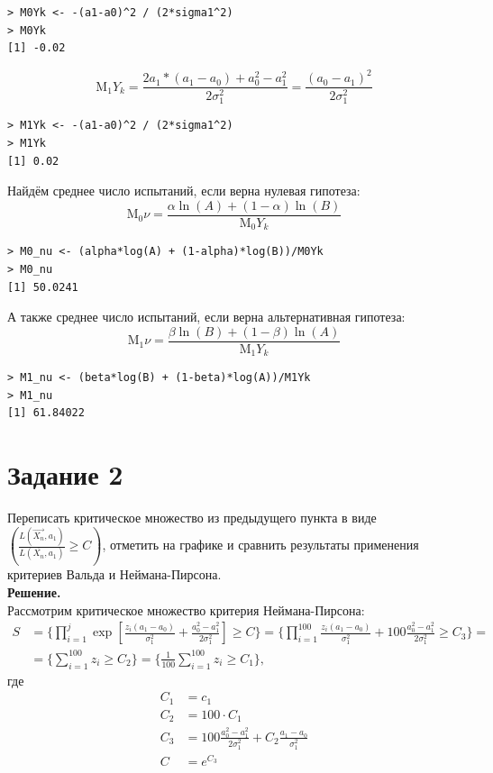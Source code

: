 \documentclass[14pt,a4paper]{scrartcl}
\begin{document}
\begin{verbatim}
> M0Yk <- -(a1-a0)^2 / (2*sigma1^2)
> M0Yk
[1] -0.02
\end{verbatim}


\begin{equation*}
\mathrm{M_1}Y_k=\frac{2 a_1 *(a_1-a_0)+a_0^{2}-a_1^{2}}{2 \sigma_1^{2}}=\frac{(a_0-a_1)^{2}}{2 \sigma_1^{2}}
\end{equation*}

\begin{verbatim}
> M1Yk <- -(a1-a0)^2 / (2*sigma1^2)
> M1Yk
[1] 0.02
\end{verbatim}

Найдём среднее число испытаний, если верна нулевая гипотеза:
\begin{equation*}
	\mathrm{M_0}\nu = \frac{\alpha \ln(A) + (1-\alpha)\ln(B)}{\mathrm{M_0}Y_k}
\end{equation*}
\begin{verbatim}
> M0_nu <- (alpha*log(A) + (1-alpha)*log(B))/M0Yk
> M0_nu
[1] 50.0241
\end{verbatim}

А также среднее число испытаний, если верна альтернативная гипотеза:
\begin{equation*}
\mathrm{M_1}\nu = \frac{\beta \ln(B) + (1-\beta)\ln(A)}{\mathrm{M_1}Y_k}
\end{equation*}
\begin{verbatim}
> M1_nu <- (beta*log(B) + (1-beta)*log(A))/M1Yk
> M1_nu
[1] 61.84022
\end{verbatim}

\newpage

\section*{Задание 2}
Переписать критическое множество из предыдущего пункта в виде $\left(\frac{L\left(\overrightarrow{X_{n}}, a_{1}\right)}{L\left(\overline{X_{n}}, a_{1}\right)} \geqslant C\right)$, отметить на графике и сравнить результаты применения критериев Вальда и Неймана-Пирсона.\\
\textbf{Решение.}\\
Рассмотрим критическое множество критерия Неймана-Пирсона:
\begin{align*}
	S &= \{ \prod\limits_{i=1}^j \exp{\left[\frac{z_{i}(a_1-a_0)}{\sigma_1^{2}}+\frac{a_0^{2}-a_1^{2}}{2 \sigma_1^{2}}\right]} \geqslant C\} = \{ \prod\limits_{i=1}^{100} \frac{z_i(a_1-a_0)}{\sigma_1^2} + 100 \frac{a_0^2-a_1^2}{2\sigma_1^2} \geqslant C_3 \} =\\
	&= \{ \sum\limits_{i=1}^{100} z_i \geqslant C_2 \} = \{ \frac{1}{100}\sum\limits_{i=1}^{100} z_i \geqslant C_1 \},
\end{align*}
где
\begin{align*}
	C_1 &= c_1\\
	C_2 &= 100 \cdot C_1\\
	C_3 &= 100 \frac{a_0^2-a_1^2}{2\sigma_1^2} + C_2 \frac{a_1-a_0}{\sigma_1^2}\\
	C &= e^{C_3}
\end{align*}
\end{document}
